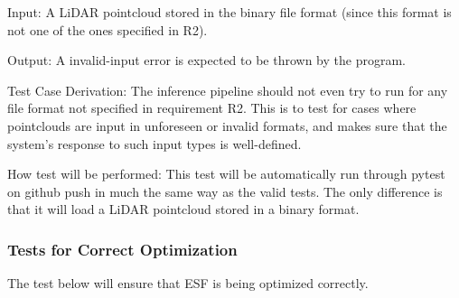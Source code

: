 \documentclass[12pt, titlepage]{article}
\newcommand{\ProjectName}{ESF }
\begin{document}
\begin{enumerate}
Input: A LiDAR pointcloud stored in the binary file format (since this format is not one of the ones specified in R2).
					
Output: A invalid-input error is expected to be thrown by the program.

Test Case Derivation: The inference pipeline should not even try to run for any file format not specified in requirement R2. This is to test for cases
where pointclouds are input in unforeseen or invalid formats, and makes sure that the system's response to such input types is well-defined. 

How test will be performed: This test will be automatically run through pytest on github push in much the same way as the valid tests. The only difference is that it will
load a LiDAR pointcloud stored in a binary format.

\end{enumerate}

\subsubsection{Tests for Correct Optimization}

The test below will ensure that \ProjectName{}is being optimized correctly.
\end{document}
